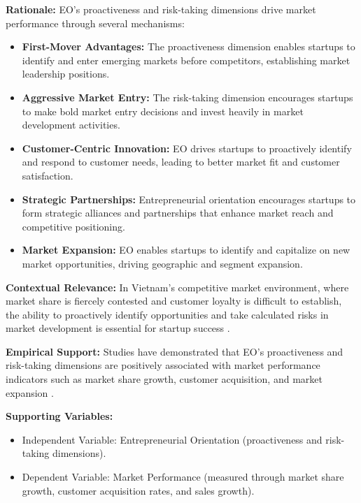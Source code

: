 \documentclass[../Main.tex]{subfiles}
\begin{document}
    \textbf{Rationale:} EO's proactiveness and risk-taking dimensions drive market performance through several mechanisms:
    \begin{itemize}
        \item \textbf{First-Mover Advantages:} The proactiveness dimension enables startups to identify and enter emerging markets before competitors, establishing market leadership positions.
        \item \textbf{Aggressive Market Entry:} The risk-taking dimension encourages startups to make bold market entry decisions and invest heavily in market development activities.
        \item \textbf{Customer-Centric Innovation:} EO drives startups to proactively identify and respond to customer needs, leading to better market fit and customer satisfaction.
        \item \textbf{Strategic Partnerships:} Entrepreneurial orientation encourages startups to form strategic alliances and partnerships that enhance market reach and competitive positioning.
        \item \textbf{Market Expansion:} EO enables startups to identify and capitalize on new market opportunities, driving geographic and segment expansion.
    \end{itemize}
    
    \textbf{Contextual Relevance:} In Vietnam's competitive market environment, where market share is fiercely contested and customer loyalty is difficult to establish, the ability to proactively identify opportunities and take calculated risks in market development is essential for startup success \cite{vietnam_innovation_report_2024}.
    
    \textbf{Empirical Support:} Studies have demonstrated that EO's proactiveness and risk-taking dimensions are positively associated with market performance indicators such as market share growth, customer acquisition, and market expansion \cite{lumpkin2001linking, wiklund2005entrepreneurial}.
    
    \textbf{Supporting Variables:}
    \begin{itemize}
        \item Independent Variable: Entrepreneurial Orientation (proactiveness and risk-taking dimensions).
        \item Dependent Variable: Market Performance (measured through market share growth, customer acquisition rates, and sales growth).
    \end{itemize}
\end{document}
